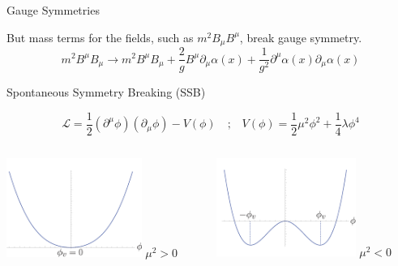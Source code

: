 \documentclass[10pt,t]{beamer}
\begin{document}
\begin{frame}{Gauge Symmetries}
    \pause

   \center But mass terms for the fields, such as $m^2B_{\mu}B^{\mu}$, break gauge symmetry.
    \begin{equation*}
         m^2B^{\mu}B_{\mu} \rightarrow  m^2B^{\mu}B_{\mu} + \frac{2}{g}B^{\mu}\partial_{\mu}\alpha(x)+\frac{1}{g^2}\partial^{\mu}\alpha(x)\partial_{\mu}\alpha(x)
    \end{equation*}

    
\end{frame}


\begin{frame}{Spontaneous Symmetry Breaking (SSB)}
    
    \begin{equation*}
    \mathcal{L} = \frac{1}{2}\left(\partial^{\mu}\phi\right)\left(\partial_{\mu}\phi\right)-V(\phi) \quad\text{;}\quad  V(\phi)=\frac{1}{2}\mu^2\phi^2+\frac{1}{4}\lambda\phi^4
    \end{equation*}
    
    
    
    \begin{columns}[T]
        \begin{column}{0.5\textwidth}
        \centering\includegraphics[width=0.7\textwidth]{Images/SSB.png}
        \small \center $\mu^2>0$
        \end{column}

        \begin{column}{0.5\textwidth}
        \centering\includegraphics[width=0.7\textwidth]{Images/SSB2.png}
        \small \center $\mu^2<0$
        \end{column}
        

\end{columns}
\end{frame}
\end{document}
